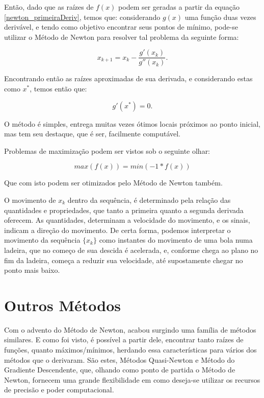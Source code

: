 
Então, dado que as raízes de $f(x)$ podem ser geradas a partir da equação
\ref{newton_primeiraDeriv}, temos que: considerando $g(x)$ uma função duas vezes
derivável, e tendo como objetivo encontrar seus pontos de mínimo, pode-se
utilizar o Método de Newton para resolver tal problema da seguinte forma:

\begin{equation}
    x_{k+1} = x_{k} - \frac {g'(x_{k})}{g''(x_{k})}.
\end{equation}

Encontrando então as raízes aproximadas de sua derivada, e considerando
estas como  $x^*$, temos então que:

\begin{equation}
    g'(x^*) = 0.
\end{equation}

O método é simples, entrega muitas vezes ótimos locais próximos ao ponto
inicial, mas tem seu destaque, que é ser, facilmente computável.

Problemas de maximização podem ser vistos sob o seguinte olhar:

\begin{equation}
    max(f(x)) = min(-1 * f(x))
\end{equation}

Que com isto podem ser otimizados pelo Método de Newton também.

O movimento de \(x_k\) dentro da sequência, é determinado pela relação das
quantidades e propriedades, que tanto a primeira quanto a segunda derivada
oferecem. As quantidades, determinam a velocidade do movimento, e os sinais,
indicam a direção do movimento. De certa forma, podemos interpretar o movimento
da sequência \(\{x_k\}\) como instantes do movimento de uma bola numa ladeira,
que no começo de sua descida é acelerada, e, conforme chega ao plano no fim da
ladeira, começa a reduzir sua velocidade, até supostamente chegar no ponto mais
baixo.


\section{{Outros Métodos}}

Com o advento do Método de Newton, acabou surgindo uma família de métodos
similares. E como foi visto, é possível a partir dele, encontrar tanto raízes
de funções, quanto máximos/mínimos, herdando essa características para vários
dos métodos que o derivaram. São estes, Métodos Quasi-Newton e Método do
Gradiente Descendente, que, olhando como ponto de partida o Método de Newton, 
fornecem uma grande flexibilidade em como deseja-se utilizar os recursos de
precisão e poder computacional.

